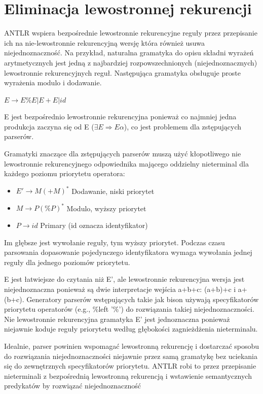 ﻿\section{Eliminacja lewostronnej rekurencji}
ANTLR wspiera bezpośrednie lewostronnie rekurencyjne reguły przez przepisanie ich
na nie-lewostronnie rekurencyjną wersję która również usuwa niejednoznaczność.
Na przykład, naturalna gramatyka do opisu składni wyrażeń arytmetycznych
jest jedną z najbardziej rozpowszechnionych (niejednoznacznych)
lewostronnie rekurencyjnych reguł. Następująca gramatyka obsługuje proste wyrażenia modulo i dodawanie.
\par
$E \rightarrow E\%E | E+E | id$
\par
E jest bezpośrednio lewostronnie rekurencyjna ponieważ co najmniej jedna produkcja zaczyna się od 
E ($\exists E \Rightarrow E\alpha$), co jest problemem dla zstępujących parserów.
\par
Gramatyki znaczące dla zstępujących parserów muszą użyć kłopotliwego 
nie lewostronnie rekurencyjnego odpowiednika mającego oddzielny
nieterminal dla każdego poziomu priorytetu operatora:
\begin{itemize}
\item $E' \rightarrow M (+ M)^*$ Dodawanie, niski priorytet
\item $M \rightarrow P (\% P)^*$ Modulo, wyższy priorytet
\item $P \rightarrow id$ Primary (id oznacza identyfikator)
\end{itemize}
Im głębsze jest wywołanie reguły, tym wyższy priorytet.
Podczas czasu parsowania dopasowanie pojedynczego identyfikatora
wymaga wywołania jednej reguły dla jednego poziomów priorytetu.
\par
E jest łatwiejsze do czytania niż E', ale lewostronnie rekurencyjna wersja jest
niejednoznaczna ponieważ są dwie interpretacje wejścia a+b+c:
(a+b)+c i a+(b+c). Generatory parserów wstępujących takie jak bison 
używają specyfikatorów priorytetu operatorów (e.g., \%left '\%') do
rozwiązania takiej niejednoznaczności.
Nie lewostronnie rekurencyjna gramatyka E'
jest jednoznaczna ponieważ niejawnie koduje reguły priorytetu
według głębokości zagnieżdżenia nieterminalu.
\par
Idealnie, parser powinien wspomagać lewostronną rekurencję i
dostarczać sposobu do rozwiązania niejednoznaczności niejawnie 
przez samą gramatykę bez uciekania się do zewnętrznych specyfikatorów priorytetu.
ANTLR robi to przez przepisanie nieterminali z bezpośrednią lewostronną rekurencją 
i wstawienie semantycznych predykatów by rozwiązać niejednoznaczność
